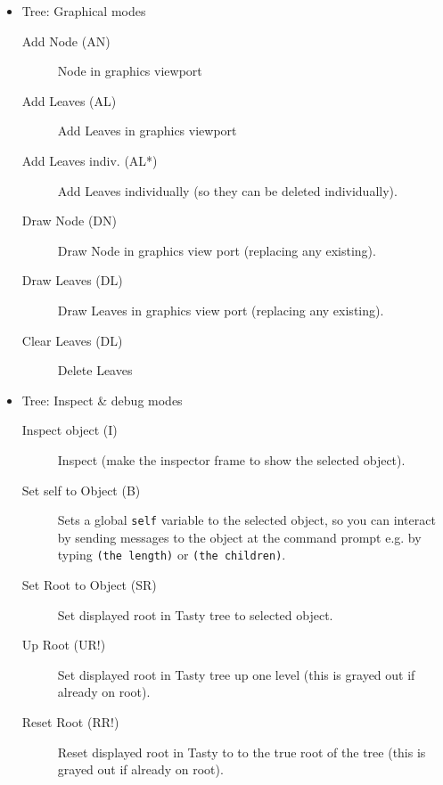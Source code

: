 \documentclass [11pt]{book}
\begin{document}
\begin{itemize}

\item Tree: Graphical modes

\begin{description}

\item [Add Node (AN)]
Node in graphics viewport

\item [Add Leaves (AL)]
Add Leaves in graphics viewport

\item [Add Leaves indiv. (AL*)]
Add Leaves individually (so they can be deleted individually).

\item [Draw Node (DN)]
Draw Node in graphics view port (replacing any existing).

\item [Draw Leaves (DL)]
Draw Leaves in graphics view port (replacing any existing).

\item [Clear Leaves (DL)]
Delete Leaves

\end{description}



\item Tree: Inspect \& debug modes

\begin{description}

\item [Inspect object (I)]
Inspect (make the inspector frame to show the selected object).

\item [Set self to Object (B)]
Sets a global \texttt{self} variable to the selected object, so you can interact by sending messages to the object at the command prompt e.g. by typing \texttt{(the length)} or \texttt{(the children)}.

\item [Set Root to Object (SR)]
Set displayed root in Tasty tree to selected object.

\item [Up Root (UR!)]
Set displayed root in Tasty tree up one level (this is grayed out if already on root).

\item [Reset Root (RR!)]
Reset displayed root in Tasty to to the true root of the tree (this is grayed out if already on root).


\end{description}
\end{itemize}
\end{document}
